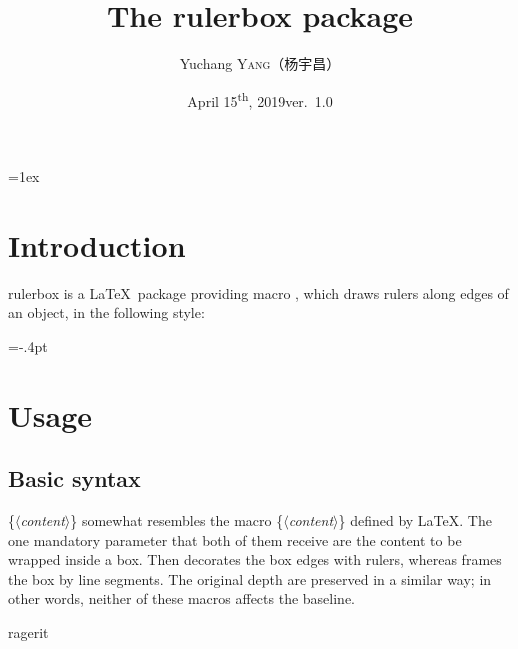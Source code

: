\documentclass[a4paper,11pt]{article}
\title{\hspace*{1cm}The \textsf{rulerbox} package\footnotemark[1]\hspace*{1cm}}
\author{Yuchang \textsc{Yang}{\fontspec{SimSun}（杨宇昌）\kern-5pt\footnotemark[2]}}
\date{April 15\textsuperscript{th}, 2019\qquad ver.~1.0}
\def\lan{\ensuremath{\langle}}
\def\ran{\ensuremath{\rangle}}
\def\param#1{\textrm{\lan\textit{#1}\ran}}
\def\texttt#1{{\ttfamily\color{darkmiku}#1}}
\begin{document}
\parskip=1ex


\section{Introduction}
	\textsf{rulerbox} is a \LaTeX\ package providing macro \texttt{\string{}}, which draws rulers along edges of an object, in the following style:\par
	\vskip-1mm
	\centerline{{=-.4pt}}
	
\section{Usage}

\subsection{Basic syntax}
	\texttt{\string{}\{\param{content}\}} somewhat resembles the macro \texttt{\string\fbox\{\param{content}\}} defined by \LaTeX. The one mandatory parameter that both of them receive are the content to be wrapped inside a box. Then \texttt{\string{}} decorates the box edges with rulers, whereas \texttt{\string\fbox} frames the box by line segments. The original depth are preserved in a similar way; in other words, neither of these macros affects the baseline.\par
	\medskip
	\centerline{\fontsize{50}{50}\selectfont ragerit}
\end{document}

